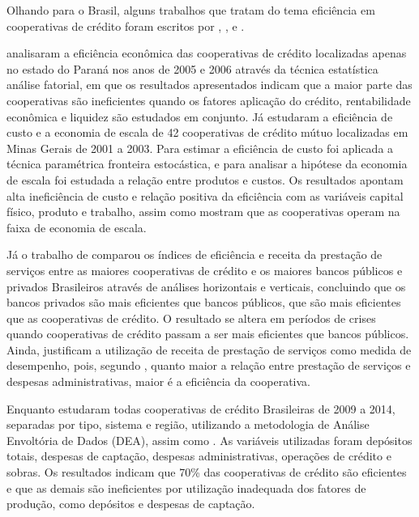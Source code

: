 \documentclass[ppgcc]{fearp}
\begin{document}
Olhando para o Brasil, alguns trabalhos que tratam do tema eficiência em cooperativas de crédito foram escritos por , ,  e .

 analisaram a eficiência econômica das cooperativas de crédito localizadas apenas no estado do Paraná nos anos de 2005 e 2006 através da técnica estatística análise fatorial, em que os resultados apresentados indicam que a maior parte das cooperativas são ineficientes quando os fatores aplicação do crédito, rentabilidade econômica e liquidez são estudados em conjunto. Já  estudaram a eficiência de custo e a economia de escala de  42 cooperativas de crédito mútuo localizadas em Minas Gerais de 2001 a 2003. Para estimar a eficiência de custo foi aplicada a técnica paramétrica fronteira estocástica, e para analisar a hipótese da economia de escala foi estudada a relação entre produtos e custos. Os  resultados apontam alta ineficiência de custo e relação positiva da eficiência com as variáveis capital físico, produto e trabalho, assim como mostram que as cooperativas operam na faixa de economia de escala.

Já o trabalho de  comparou os índices de eficiência e receita da prestação de serviços entre as maiores cooperativas de crédito e os maiores bancos públicos e privados Brasileiros através de análises horizontais e verticais, concluindo que os bancos privados são mais eficientes que bancos públicos, que são mais eficientes que as cooperativas de crédito. O resultado se altera em períodos de crises quando cooperativas de crédito passam a ser mais eficientes que bancos públicos. Ainda, justificam a utilização de receita de prestação de serviços como medida de desempenho, pois, segundo  ,  quanto maior a relação entre prestação de serviços e despesas administrativas, maior é a eficiência da cooperativa.

Enquanto  estudaram todas cooperativas de crédito Brasileiras de 2009 a 2014, separadas por tipo, sistema e região, utilizando a metodologia de Análise Envoltória de Dados (DEA), assim como  . As variáveis utilizadas foram depósitos totais, despesas de captação, despesas administrativas, operações de crédito e sobras. Os resultados indicam que 70\% das cooperativas de crédito são eficientes e que as demais são ineficientes por utilização inadequada dos fatores de produção, como depósitos e despesas de captação.
\end{document}
